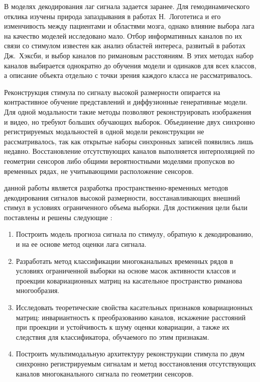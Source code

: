 В моделях декодирования лаг сигнала задается заранее. Для гемодинамического отклика изучены природа запаздывания в работах Н.~Логотетиса и его изменчивость между пациентами и областями мозга, однако влияние выбора лага на качество моделей исследовано мало. Отбор информативных каналов по их связи со стимулом известен как анализ областей интереса, развитый в работах Дж.~Хэксби, и выбор каналов по римановым расстояниям. В этих методах набор каналов выбирается однократно до обучения модели и одинаков для всех классов, а описание объекта отдельно с точки зрения каждого класса не рассматривалось.

Реконструкция стимула по сигналу высокой размерности опирается на контрастивное обучение представлений и диффузионные генеративные модели. Для одной модальности такие методы позволяют реконструировать изображения и видео, но требуют больших обучающих выборок. Объединение двух синхронно регистрируемых модальностей в одной модели реконструкции не рассматривалось, так как открытые наборы синхронных записей появились лишь недавно. Восстановление отсутствующих каналов выполняется интерполяцией по геометрии сенсоров либо общими вероятностными моделями пропусков во временных рядах, не учитывающими расположение сенсоров.

{\aim} данной работы является разработка пространственно-временных методов декодирования сигналов высокой размерности, восстанавливающих внешний стимул в условиях ограниченного объема выборки. Для достижения цели были поставлены и решены следующие {\tasks}:
\begin{enumerate}[beginpenalty=10000]
    \item Построить модель прогноза сигнала по стимулу, обратную к декодированию, и на ее основе метод оценки лага сигнала.
    \item Разработать метод классификации многоканальных временных рядов в условиях ограниченной выборки на основе масок активности классов и проекции ковариационных матриц на касательное пространство риманова многообразия.
    \item Исследовать теоретические свойства касательных признаков ковариационных матриц: инвариантность к преобразованию каналов, искажение расстояний при проекции и устойчивость к шуму оценки ковариации, а также их следствия для классификатора, обучаемого по этим признакам.
    \item Построить мультимодальную архитектуру реконструкции стимула по двум синхронно регистрируемым сигналам и метод восстановления отсутствующих каналов многоканального сигнала по геометрии сенсоров.
\end{enumerate}

